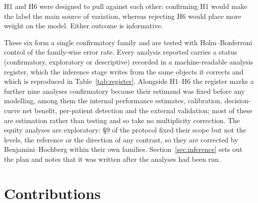 H1 and H6 were designed to pull against each other: confirming H1 would make
the label the main source of variation, whereas rejecting H6 would place more
weight on the model. Either outcome is informative.

These six form a single confirmatory family and are tested with
Holm--Bonferroni control of the family-wise error rate. Every analysis reported
carries a status (confirmatory, exploratory or descriptive) recorded in a
machine-readable analysis register, which the inference stage writes from the
same objects it corrects and which is reproduced in
Table~\ref{tab:register}. Alongside
H1--H6 the register marks a further nine analyses confirmatory because their
estimand was fixed before any modelling, among them the internal performance
estimates, calibration, decision-curve net benefit, per-patient detection and
the external validation; most of these are estimation rather than testing and
so take no multiplicity correction. The equity analyses are exploratory: §9 of
the protocol fixed their scope but not the levels, the reference or the
direction of any contrast, so they are corrected by Benjamini--Hochberg within
their own families. Section~\ref{sec:inference} sets out the plan and notes
that it was written after the analyses had been run.


\section{Contributions}
\label{sec:contrib}

